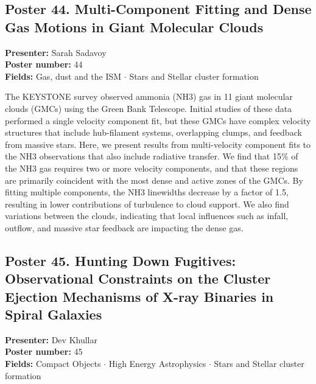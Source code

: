 \hypertarget{poster-abstract-talk-119}{}\label{poster-abstract-page-talk-119}
\subsection*{Poster 44. Multi-Component Fitting and Dense Gas Motions in Giant Molecular Clouds}
\textbf{Presenter:} Sarah Sadavoy\\
\textbf{Poster number:} 44\\
\textbf{Fields:} Gas, dust and the ISM $\cdot$ Stars and Stellar cluster formation

The KEYSTONE survey observed ammonia (NH3) gas in 11 giant molecular clouds (GMCs) using the Green Bank Telescope. Initial studies of these data performed a single velocity component fit, but these GMCs have complex velocity structures that include hub-filament systems, overlapping clumps, and feedback from massive stars. Here, we present results from multi-velocity component fits to the NH3 observations that also include radiative transfer. We find that 15\% of the NH3 gas requires two or more velocity components, and that these regions are primarily coincident with the most dense and active zones of the GMCs. By fitting multiple components, the NH3 linewidths decrease by a factor of 1.5, resulting in lower contributions of turbulence to cloud support. We also find variations between the clouds, indicating that local influences such as infall, outflow, and massive star feedback are impacting the dense gas.

\hypertarget{poster-abstract-talk-107}{}\label{poster-abstract-page-talk-107}
\subsection*{Poster 45. Hunting Down Fugitives: Observational Constraints on the Cluster Ejection Mechanisms of X-ray Binaries in Spiral Galaxies}
\textbf{Presenter:} Dev Khullar\\
\textbf{Poster number:} 45\\
\textbf{Fields:} Compact Objects $\cdot$ High Energy Astrophysics $\cdot$ Stars and Stellar cluster formation

